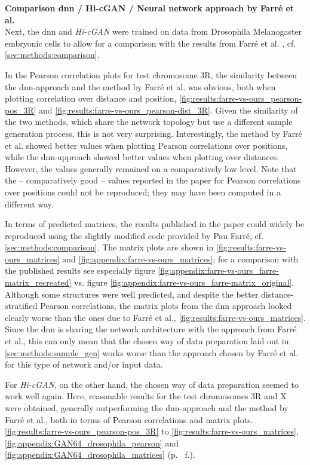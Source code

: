 \textbf{Comparison \acrshort{dnn} / Hi-cGAN / Neural network approach by Farr\'e  et al.}\\
Next, the \acrshort{dnn} and \emph{Hi-cGAN} were trained on data from Drosophila Melanogaster embryonic cells
to allow for a comparison with the results from Farr\'e et al. \cite{Farre2018a}, cf. \cref{sec:methods:comparison}.

In the Pearson correlation plots for test chromosome 3R, the similarity between the \acrshort{dnn}-approach and the method by 
Farré et al. was obvious, both when plotting correlation over distance and position, \cref{fig:results:farre-vs-ours_pearson-pos_3R} 
and \ref{fig:results:farre-vs-ours_pearson-dist_3R}. 
Given the similarity of the two methods, which share the network topology but use a different sample generation process,
this is not very surprising.
Interestingly, the method by Farré et al. showed better values when plotting Pearson correlations over positions,
while the \acrshort{dnn}-approach showed better values when plotting over distances. 
However, the values generally remained on a comparatively low level.
Note that the -- comparatively good -- values reported in the paper \cite[fig.~3]{Farre2018a} for Pearson correlations over positions could not be reproduced; 
they may have been computed in a different way.

In terms of predicted matrices, the results published in the paper \cite{Farre2018a} could widely be reproduced using the slightly modified 
code provided by Pau Farré, cf. \cref{sec:methods:comparison}. 
The matrix plots are shown in \cref{fig:results:farre-vs-ours_matrices} and \ref{fig:appendix:farre-vs-ours_matrices};
for a comparison with the published results see especially figure \ref{fig:appendix:farre-vs-ours_farre-matrix_recreated} vs. figure \ref{fig:appendix:farre-vs-ours_farre-matrix_original}.
Although some structures were well predicted, and despite the better distance-stratified Pearson correlations, 
the matrix plots from the \acrshort{dnn} approach looked clearly worse than the ones due to Farré et al., \cref{fig:results:farre-vs-ours_matrices}.
Since the \acrlong{dnn} is sharing the network architecture with the approach from Farr\'e et al., 
this can only mean that the chosen way of data preparation laid out in \cref{sec:methods:sample_gen} 
works worse than the approach chosen by Farré et al. for this type of network and/or input data.

For \emph{Hi-cGAN}, on the other hand, the chosen way of data preparation seemed to work well again.
Here, reasonable results for the test chromosomes 3R and X were obtained, 
generally outperforming the \acrshort{dnn}-approach and the method by Farr\'e et al., both in terms of Pearson correlations and matrix plots. 
\cref{fig:results:farre-vs-ours_pearson-pos_3R} to \ref{fig:results:farre-vs-ours_matrices}, 
\ref{fig:appendix:GAN64_drosophila_pearson} and \ref{fig:appendix:GAN64_drosophila_matrices} (p.~\pageref{fig:appendix:GAN64_drosophila_pearson} f.).

